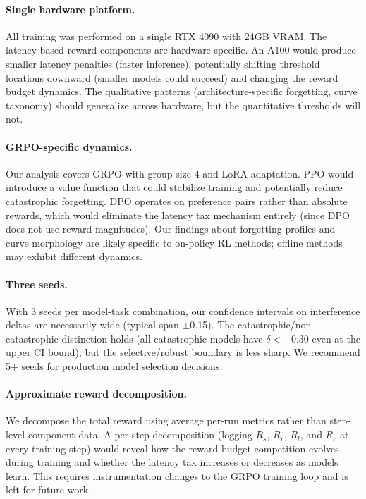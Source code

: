 \documentclass[11pt]{article}
\begin{document}
\paragraph{Single hardware platform.}
All training was performed on a single RTX 4090 with 24GB VRAM.  The latency-based reward components are hardware-specific.  An A100 would produce smaller latency penalties (faster inference), potentially shifting threshold locations downward (smaller models could succeed) and changing the reward budget dynamics.  The qualitative patterns (architecture-specific forgetting, curve taxonomy) should generalize across hardware, but the quantitative thresholds will not.

\paragraph{GRPO-specific dynamics.}
Our analysis covers GRPO with group size 4 and LoRA adaptation.  PPO would introduce a value function that could stabilize training and potentially reduce catastrophic forgetting.  DPO operates on preference pairs rather than absolute rewards, which would eliminate the latency tax mechanism entirely (since DPO does not use reward magnitudes).  Our findings about forgetting profiles and curve morphology are likely specific to on-policy RL methods; offline methods may exhibit different dynamics.

\paragraph{Three seeds.}
With 3 seeds per model-task combination, our confidence intervals on interference deltas are necessarily wide (typical span $\pm$0.15).  The catastrophic/non-catastrophic distinction holds (all catastrophic models have $\delta < -0.30$ even at the upper CI bound), but the selective/robust boundary is less sharp.  We recommend 5+ seeds for production model selection decisions.

\paragraph{Approximate reward decomposition.}
We decompose the total reward using average per-run metrics rather than step-level component data.  A per-step decomposition (logging $R_s$, $R_r$, $R_l$, and $R_c$ at every training step) would reveal how the reward budget competition evolves during training and whether the latency tax increases or decreases as models learn.  This requires instrumentation changes to the GRPO training loop and is left for future work.
\end{document}
